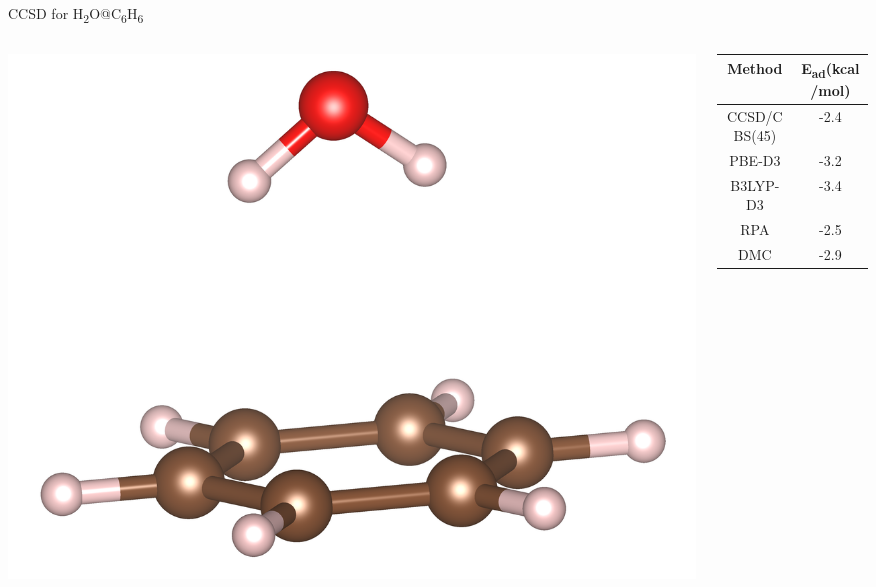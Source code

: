 \begin{block}{CCSD for H\textsubscript{2}O@C\textsubscript{6}H\textsubscript{6}}
  \begin{columns}
    \begin{column}{.40\linewidth}
      \includegraphics[width=\textwidth]{figures/geometry_small_cropped.png}
    \end{column}
    \begin{column}{.60\linewidth}
      \begin{tabular}{cc} 
        Method & E\textsubscript{ad}{\small(kcal/mol)}\\\hline
        CCSD/CBS(45) & -2.4  \\
        PBE-D3\cite{ajala2019assessment} & -3.2 \\
        B3LYP-D3\cite{ajala2019assessment} & -3.4 \\
        RPA\cite{ajala2019assessment} & -2.5 \\
        DMC\cite{ajala2019assessment} & -2.9
      \end{tabular}
    \end{column}
  \end{columns}
\end{block}

